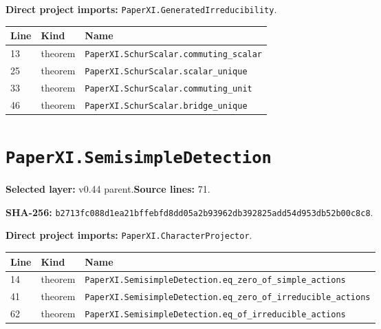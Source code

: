 \documentclass[10pt,oneside]{book}
\begin{document}
\textbf{Direct project imports:} \nolinkurl{PaperXI.GeneratedIrreducibility}.

\begin{longtable}{@{}p{}p{}p{}@{}}\toprule Line&Kind&Name\\\midrule\endhead

13&theorem&\nolinkurl{PaperXI.SchurScalar.commuting_scalar}\\

25&theorem&\nolinkurl{PaperXI.SchurScalar.scalar_unique}\\

33&theorem&\nolinkurl{PaperXI.SchurScalar.commuting_unit}\\

46&theorem&\nolinkurl{PaperXI.SchurScalar.bridge_unique}\\

\bottomrule\end{longtable}

\section{\texorpdfstring{\nolinkurl{PaperXI.SemisimpleDetection}}{PaperXI.SemisimpleDetection}}\label{module:PaperXI.SemisimpleDetection}

\textbf{Selected layer:} v0.44 parent.\quad\textbf{Source lines:} 71.\par\textbf{SHA-256:} {\scriptsize\nolinkurl{b2713fc088d1ea21bffebfd8dd05a2b93962db392825add54d953db52b00c8c8}}.


\textbf{Direct project imports:} \nolinkurl{PaperXI.CharacterProjector}.

\begin{longtable}{@{}p{}p{}p{}@{}}\toprule Line&Kind&Name\\\midrule\endhead

14&theorem&\nolinkurl{PaperXI.SemisimpleDetection.eq_zero_of_simple_actions}\\

41&theorem&\nolinkurl{PaperXI.SemisimpleDetection.eq_zero_of_irreducible_actions}\\

62&theorem&\nolinkurl{PaperXI.SemisimpleDetection.eq_of_irreducible_actions}\\

\bottomrule\end{longtable}
\end{document}
